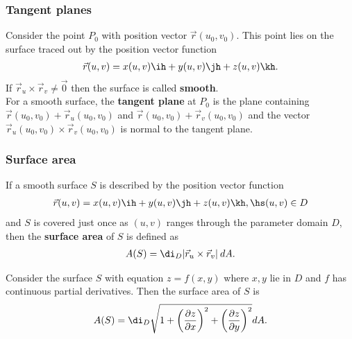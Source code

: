 \documentclass{article}
\begin{document}
\subsubsection{Tangent planes}

\begin{definition}
    Consider the point $P_0$ with position vector $\vec r(u_0, v_0)$. This point lies
    on the surface traced out by the position vector function
    \begin{align*}
        \vec r(u,v) = x(u,v)\ih + y(u,v)\jh + z(u,v)\kh.
    \end{align*}
    If $\vec r_u \times\vec r_v\not=\vec 0$ then the surface is called \textbf{smooth}.\\
    For a smooth surface, the \textbf{tangent plane} at $P_0$ is the plane containing
    $\vec r(u_0,v_0)+\vec r_u(u_0,v_0)$ and $\vec r(u_0,v_0)+\vec r_v(u_0,v_0)$ and the vector
    $\vec r_u(u_0,v_0)\times \vec r_v(u_0,v_0)$ is normal to the tangent plane.

\end{definition}

\subsubsection{Surface area}

\begin{definition}
    If a smooth surface $S$ is described by the position vector function
    \begin{align*}
        \vec r(u,v) = x(u,v)\ih + y(u,v)\jh + z(u,v)\kh,\hs (u,v)\in D
    \end{align*}
    and $S$ is covered just once as $(u,v)$ ranges through the parameter domain $D$,
    then the \textbf{surface area} of $S$ is defined as
    \begin{align*}
        A(S)=\di_D |\vec r_u \times \vec r_v|\:dA.
    \end{align*}
\end{definition}
\begin{theorem}
    Consider the surface $S$ with equation $z=f(x,y)$ where $x,y$ lie in $D$ and $f$
    has continuous partial derivatives. Then the surface area of $S$ is
    \begin{align*}
        A(S) = \di_D \sqrt{1+\left(\frac{\partial z}{\partial x}\right)^2 + \left(\frac{\partial z}{\partial y}\right)^2}dA.
    \end{align*}
\end{theorem}
\end{document}

